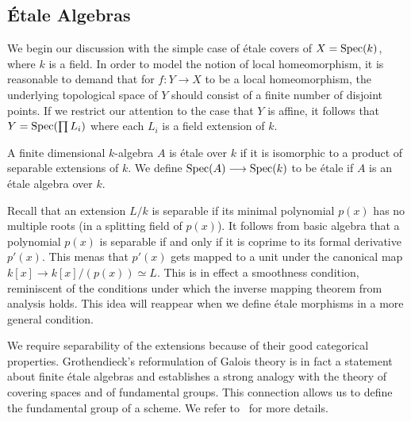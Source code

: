 \subsection{\'Etale Algebras}
We begin our discussion with the simple case of \'etale covers of $X = \operatorname{Spec}(k)$, where $k$ is a field. In order to model the notion of local homeomorphism, it is reasonable to demand that for $f: Y \to X$ to be a local homeomorphism,  the underlying topological space of $Y$ should consist of a finite number of disjoint points. If we restrict our attention to the case that $Y$ is affine, it follows that $Y = \operatorname{Spec}(\prod L_i)$ where each $L_i$ is a field extension of $k$. 

\begin{definition}
  A finite dimensional $k$-algebra $A$ is \'etale over $k$ if it is isomorphic to a product of separable extensions of $k$. We define $\operatorname{Spec}(A) \longrightarrow \operatorname{Spec}(k)$ to be \'etale if $A$ is an \'etale algebra over $k$.
\end{definition}

Recall that an extension $L/k$ is separable if its minimal polynomial $p(x)$ has no multiple roots (in a splitting field of $p(x)$). It follows from basic algebra that a polynomial $p(x)$ is separable if and only if it is coprime to its formal derivative $p'(x)$. This menas that $p'(x)$ gets mapped to a unit under the canonical map $k[x] \to k[x]/(p(x)) \simeq L$. This is in effect a smoothness condition, reminiscent of the conditions under which the inverse mapping theorem from analysis holds. This idea will reappear when we define \'etale morphisms in a more general condition.

We require separability of the extensions because of their good categorical properties. Grothendieck's reformulation of Galois theory is in fact a statement about finite \'etale algebras and establishes a strong analogy with the theory of covering spaces and of fundamental groups. This connection allows us to define the fundamental group of a scheme. We refer to~\cite{Szamuely} for more details.

